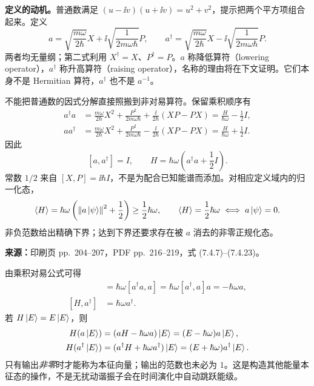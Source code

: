 \textbf{定义的动机。}普通数满足 $(u-\ii v)(u+\ii v)=u^2+v^2$，提示把两个平方项组合起来。定义
\begin{equation}
  \boxed{a=\sqrt{\frac{m\omega}{2\hbar}}X
              +\ii\sqrt{\frac1{2m\omega\hbar}}P},\qquad
  \boxed{a^\dagger=\sqrt{\frac{m\omega}{2\hbar}}X
              -\ii\sqrt{\frac1{2m\omega\hbar}}P}.
  \label{eq:QM-C07-S04-ladder-definition}
\end{equation}
两者均无量纲；第二式利用 $X^\dagger=X$、$P^\dagger=P$。$a$ 称降低算符（lowering operator），$a^\dagger$ 称升高算符（raising operator），名称的理由将在下文证明。它们本身不是 Hermitian 算符，$a^\dagger$ 也不是 $a^{-1}$。

不能把普通数的因式分解直接照搬到非对易算符。保留乘积顺序有
\begin{align}
  a^\dagger a
    &=\frac{m\omega}{2\hbar}X^2+\frac{P^2}{2m\omega\hbar}
      +\frac{\ii}{2\hbar}(XP-PX)
      =\frac{H}{\hbar\omega}-\frac12I,\\
  aa^\dagger
    &=\frac{m\omega}{2\hbar}X^2+\frac{P^2}{2m\omega\hbar}
      -\frac{\ii}{2\hbar}(XP-PX)
      =\frac{H}{\hbar\omega}+\frac12I.
\end{align}
因此
\begin{equation}
  \boxed{[a,a^\dagger]=I},\qquad
  \boxed{H=\hbar\omega\left(a^\dagger a+\frac12I\right)}.
  \label{eq:QM-C07-S04-factorization}
\end{equation}
常数 $1/2$ 来自 $[X,P]=\ii\hbar I$，不是为配合已知能谱而添加。对相应定义域内的归一化态，
\begin{equation}
  \left\langle H \right\rangle=\hbar\omega\left(\left\lVert a\left|\psi\right\rangle \right\rVert^2+\frac12\right)
     \ge\frac12\hbar\omega,
  \qquad
  \left\langle H \right\rangle=\frac12\hbar\omega\iff a\left|\psi\right\rangle=0.
  \label{eq:QM-C07-S04-energy-bound}
\end{equation}
非负范数给出精确下界；达到下界还要求存在被 $a$ 消去的非零正规化态。

\textbf{来源：}印刷页 pp.~204--207，PDF pp.~216--219，式 (7.4.7)--(7.4.23)。

由乘积对易公式可得
\begin{align}
  [H,a]&=\hbar\omega[a^\dagger a,a]
       =\hbar\omega[a^\dagger,a]a=-\hbar\omega a,\\
  [H,a^\dagger]&=\hbar\omega a^\dagger.
\end{align}
若 $H\left|E\right\rangle=E\left|E\right\rangle$，则
\begin{align}
  H(a\left|E\right\rangle)&=(aH-\hbar\omega a)\left|E\right\rangle
                 =(E-\hbar\omega)a\left|E\right\rangle,\\
  H(a^\dagger\left|E\right\rangle)&=(a^\dagger H+\hbar\omega a^\dagger)\left|E\right\rangle
                 =(E+\hbar\omega)a^\dagger\left|E\right\rangle.
  \label{eq:QM-C07-S04-energy-shift}
\end{align}
只有输出\emph{非零}时才能称为本征向量；输出的范数也未必为 $1$。这是构造其他能量本征态的操作，不是无扰动谐振子会在时间演化中自动跳跃能级。

